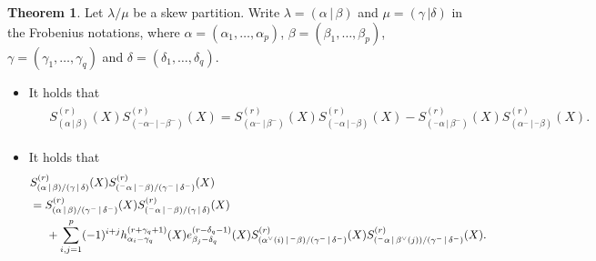 \documentclass[12pt]{amsart}%
\theoremstyle{definition}
\newtheorem{theorem}{Theorem}[section]
\begin{document}
\begin{theorem}
Let $\lambda/\mu$ be a skew partition.
Write $\lambda=(\alpha\,|\,\beta)$
and $\mu=(\gamma\,|\delta)$
in the Frobenius notations, where 
$\alpha=(\alpha_1,\ldots,\alpha_p)$,
$\beta=(\beta_1,\ldots,\beta_p)$,
$\gamma=(\gamma_1,\ldots,\gamma_q)$ 
and $\delta=(\delta_1,\ldots,\delta_q)$.
\begin{itemize}
\item[(1)] 
It holds that 
\begin{align}
\label{for:non-skew Giambelli}
\begin{split}
& S_{(\alpha\,|\,\beta)}^{(r)}(X)
 S_{({}^{-}\alpha^{-}\,|\,{}^{-}\beta^{-})}^{(r)}(X)
 =S_{(\alpha^{-}\,|\,\beta^{-})}^{(r)}(X)
 S_{({}^{-}\alpha\,|\,{}^{-}\beta)}^{(r)}(X)
-S_{({}^{-}\alpha\,|\,\beta^{-})}^{(r)}(X)
 S_{(\alpha^{-}\,|\,{}^{-}\beta)}^{(r)}(X).
\end{split}
\end{align}
\item[(2)] 
It holds that 
\begin{align}
\label{for:skew Giambelli}
\begin{split}
&S_{(\alpha\,|\,\beta)/(\gamma\,|\,\delta)}^{(r)}(X)
S_{({}^{-}\alpha\,|\,{}^{-}\beta)/(\gamma^{-}\,|\,\delta^{-})}^{(r)}(X)\\
&
=S_{(\alpha\,|\,\beta)/(\gamma^{-}\,|\,\delta^{-})}^{(r)}(X)
 S_{({}^{-}\alpha\,|\,{}^{-}\beta)/(\gamma\,|\,\delta)}^{(r)}(X)\\
 &\hspace{5mm}+\sum^{p}_{i,j=1}(-1)^{i+j}h_{\alpha_i-\gamma_q}^{(r+\gamma_q+1)}(X)e_{\beta_j-\delta_q}^{(r-\delta_q-1)}(X) S_{(\alpha^{\vee}(i)\,|\,{}^{-}\beta)/(\gamma^{-}\,|\,\delta^{-})}^{(r)}(X)S_{({}^{-}\alpha\,|\,\beta^{\vee}(j))/(\gamma^{-}\,|\,\delta^{-})}^{(r)}(X).
\end{split}
\end{align}    
\end{itemize}
\end{theorem}
\end{document}
